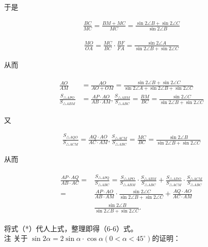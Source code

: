 \documentclass[10pt]{article}
\begin{document}
于是

\begin{align*}
\frac{B C}{M C}=\frac{B M+M C}{M C}=\frac{\sin 2 \angle B+\sin 2 \angle C}{\sin 2 \angle B}
\end{align*}

\begin{align*}
\frac{M O}{O A}=\frac{M C}{B C} \cdot \frac{B F}{F A}=\frac{\sin 2 \angle A}{\sin 2 \angle B+\sin 2 \angle C}
\end{align*}

从而

\begin{align*}
\begin{aligned}
\frac{A O}{A M} & =\frac{A O}{A O+O M}=\frac{\sin 2 \angle B+\sin 2 \angle C}{\sin 2 \angle A+\sin 2 \angle B+\sin 2 \angle C} \\
\frac{S_{\triangle A P O}}{S_{\triangle A B M}} & =\frac{A P \cdot A O}{A B \cdot A M}, \frac{S_{\triangle A B M}}{S_{\triangle A B C}}=\frac{B M}{B C}=\frac{\sin 2 \angle C}{\sin 2 \angle B+\sin 2 \angle C}
\end{aligned}
\end{align*}

又

\begin{align*}
\frac{S_{\triangle A Q O}}{S_{\triangle A C M}}=\frac{A Q \cdot A O}{A C \cdot A M}, \frac{S_{\triangle A C M}}{S_{\triangle A B C}}=\frac{M C}{B C}=\frac{\sin 2 \angle B}{\sin 2 \angle B+\sin 2 \angle C}
\end{align*}

从而

\begin{align*}
\begin{aligned}
\frac{A P \cdot A Q}{A B \cdot A C}= & \frac{S_{\triangle A P Q}}{S_{\triangle A B C}}=\frac{S_{\triangle A P O}}{S_{\triangle A B M}} \cdot \frac{S_{\triangle A B M}}{S_{\triangle A B C}}+\frac{S_{\triangle A D O}}{S_{\triangle A C M}} \cdot \frac{S_{\triangle A C M}}{S_{\triangle A B C}} \\
= & \frac{A P \cdot A O}{A B \cdot A M} \cdot \frac{\sin 2 \angle C}{\sin 2 \angle B+\sin 2 \angle C}+\frac{A Q \cdot A O}{A C \cdot A M} \\
& \frac{\sin 2 \angle B}{\sin 2 \angle B+\sin 2 \angle C} .
\end{aligned}
\end{align*}

将式（*）代人上式，整理即得（6-6）式。\\
注 关于 $\sin 2 \alpha=2 \sin \alpha \cdot \cos \alpha\left(0<\alpha<45^{\circ}\right)$的证明：
\end{document}
